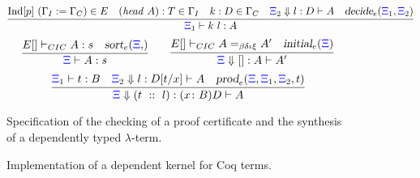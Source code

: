 \begin{figure}[t]
\centering
  \[
\infer{\XXi_1\vdash k\ l : A}
      { \mathrm{Ind}[p] \ (\Gamma_I := \Gamma_C) \in E\quad 
       (\mathit{head} \ A) : T \in \Gamma_I\quad  
       k : D \in \Gamma_C\quad 
       \bc{\XXi_2}{} l D A \quad\unfoldExpert{\XXi_1}{\XXi_2}} 
\]
\vskip -18pt
\[
  \infer{\XXi\vdash  A : s}{E[] \vdash_{CIC} A : s\quad \sortExpert{\XXi}}%
  \qquad
  \infer{\bc{\XXi}{}{[]} A A'}{E[]\vdash_{CIC} A =_{\beta\delta\iota\xi}A'\quad\initLExpert{\XXi}}
\]
  \vskip -18pt
\[
  \infer{\bc{\XXi}{}{(t\ ::\ l)}{\depprod{x}{B}{D}}{A}}
        {\XXi_1\vdash t : B\quad
         \bc{\XXi_2}{}l {D[t/x]} A\quad
         \prodE{\XXi}{\XXi_1}{\XXi_2}{t}}
\]
\caption{Specification of the checking of a proof certificate and the
  synthesis of a dependently typed $\lambda$-term.}
\label{fig:augmented}
\end{figure}

\begin{figure}


\caption{Implementation of a  dependent kernel for Coq terms.}
\label{fig:kernel}
\end{figure}

